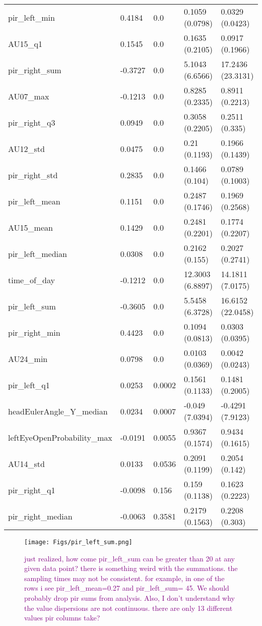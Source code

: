 \begin{table}[h]
\begin{tabular}{p{3cm}|p{2cm}|p{1cm}|p{3cm}|p{3cm}}
pir\_left\_min & 0.4184 & 0.0 & 0.1059 (0.0798) & 0.0329 (0.0423) \\
AU15\_q1 & 0.1545 & 0.0 & 0.1635 (0.2105) & 0.0917 (0.1966) \\
pir\_right\_sum & -0.3727 & 0.0 & 5.1043 (6.6566) & 17.2436 (23.3131) \\
AU07\_max & -0.1213 & 0.0 & 0.8285 (0.2335) & 0.8911 (0.2213) \\
pir\_right\_q3 & 0.0949 & 0.0 & 0.3058 (0.2205) & 0.2511 (0.335) \\
AU12\_std & 0.0475 & 0.0 & 0.21 (0.1193) & 0.1966 (0.1439) \\
pir\_right\_std & 0.2835 & 0.0 & 0.1466 (0.104) & 0.0789 (0.1003) \\
pir\_left\_mean & 0.1151 & 0.0 & 0.2487 (0.1746) & 0.1969 (0.2568) \\
AU15\_mean & 0.1429 & 0.0 & 0.2481 (0.2201) & 0.1774 (0.2207) \\
pir\_left\_median & 0.0308 & 0.0 & 0.2162 (0.155) & 0.2027 (0.2741) \\
time\_of\_day & -0.1212 & 0.0 & 12.3003 (6.8897) & 14.1811 (7.0175) \\
pir\_left\_sum & -0.3605 & 0.0 & 5.5458 (6.3728) & 16.6152 (22.0458) \\
pir\_right\_min & 0.4423 & 0.0 & 0.1094 (0.0813) & 0.0303 (0.0395) \\
AU24\_min & 0.0798 & 0.0 & 0.0103 (0.0369) & 0.0042 (0.0243) \\
pir\_left\_q1 & 0.0253 & 0.0002 & 0.1561 (0.1133) & 0.1481 (0.2005) \\
headEulerAngle\_Y\_median & 0.0234 & 0.0007 & -0.049 (7.0394) & -0.4291 (7.9123) \\
leftEyeOpenProbability\_max & -0.0191 & 0.0055 & 0.9367 (0.1574) & 0.9434 (0.1615) \\
AU14\_std & 0.0133 & 0.0536 & 0.2091 (0.1199) & 0.2054 (0.142) \\
pir\_right\_q1 & -0.0098 & 0.156 & 0.159 (0.1138) & 0.1623 (0.2223) \\
pir\_right\_median & -0.0063 & 0.3581 & 0.2179 (0.1563) & 0.2208 (0.303) \\
    \midrule
    \bottomrule
\end{tabular}
\end{table}






\begin{subfigure}{.4\textwidth}
  \centering
  \texttt{[image: Figs/pir\_left\_sum.png]}  
  \caption{\textcolor{purple}{just realized, how come pir\_left\_sum can be greater than 20 at any given data point? there is something weird with the summations. the sampling times may not be consistent. for example, in one of the rows i see pir\_left\_mean=0.27 and pir\_left\_sum= 45. We should probably drop pir sums from analysis. Also, I don't understand why the value dispersions are not continuous. there are only 13 different values pir columns take? }}
  \label{fig:}
\end{subfigure}






